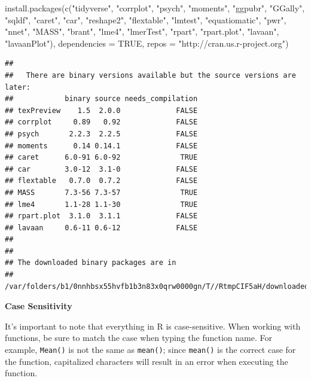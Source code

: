 \documentclass[
]{book}
\newenvironment{Shaded}{\begin{snugshade}}{\end{snugshade}}
\newcommand{\AttributeTok}[1]{\textcolor[rgb]{0.77,0.63,0.00}{#1}}
\newcommand{\ConstantTok}[1]{\textcolor[rgb]{0.00,0.00,0.00}{#1}}
\newcommand{\FunctionTok}[1]{\textcolor[rgb]{0.00,0.00,0.00}{#1}}
\newcommand{\NormalTok}[1]{#1}
\newcommand{\StringTok}[1]{\textcolor[rgb]{0.31,0.60,0.02}{#1}}
\begin{document}
\begin{Shaded}
\begin{Highlighting}[]
\FunctionTok{install.packages}\NormalTok{(}\FunctionTok{c}\NormalTok{(}\StringTok{"tidyverse"}\NormalTok{, }\StringTok{"corrplot"}\NormalTok{, }\StringTok{"psych"}\NormalTok{, }\StringTok{"moments"}\NormalTok{, }\StringTok{"ggpubr"}\NormalTok{, }\StringTok{"GGally"}\NormalTok{, }\StringTok{"sqldf"}\NormalTok{, }\StringTok{"caret"}\NormalTok{, }\StringTok{"car"}\NormalTok{, }\StringTok{"reshape2"}\NormalTok{, }\StringTok{"flextable"}\NormalTok{, }\StringTok{"lmtest"}\NormalTok{, }\StringTok{"equatiomatic"}\NormalTok{, }\StringTok{"pwr"}\NormalTok{, }\StringTok{"nnet"}\NormalTok{, }\StringTok{"MASS"}\NormalTok{, }\StringTok{"brant"}\NormalTok{, }\StringTok{"lme4"}\NormalTok{, }\StringTok{"lmerTest"}\NormalTok{, }\StringTok{"rpart"}\NormalTok{, }\StringTok{"rpart.plot"}\NormalTok{, }\StringTok{"lavaan"}\NormalTok{, }\StringTok{"lavaanPlot"}\NormalTok{), }\AttributeTok{dependencies =} \ConstantTok{TRUE}\NormalTok{, }\AttributeTok{repos =} \StringTok{"http://cran.us.r{-}project.org"}\NormalTok{)}
\end{Highlighting}
\end{Shaded}

\begin{verbatim}
## 
##   There are binary versions available but the source versions are later:
##            binary source needs_compilation
## texPreview    1.5  2.0.0             FALSE
## corrplot     0.89   0.92             FALSE
## psych       2.2.3  2.2.5             FALSE
## moments      0.14 0.14.1             FALSE
## caret      6.0-91 6.0-92              TRUE
## car        3.0-12  3.1-0             FALSE
## flextable   0.7.0  0.7.2             FALSE
## MASS       7.3-56 7.3-57              TRUE
## lme4       1.1-28 1.1-30              TRUE
## rpart.plot  3.1.0  3.1.1             FALSE
## lavaan     0.6-11 0.6-12             FALSE
## 
## 
## The downloaded binary packages are in
##  /var/folders/b1/0nnhbsx55hvfb1b3n83x0qrw0000gn/T//RtmpCIF5aH/downloaded_packages
\end{verbatim}

\textbf{Case Sensitivity}

It's important to note that everything in R is case-sensitive. When working with functions, be sure to match the case when typing the function name. For example, \texttt{Mean()} is not the same as \texttt{mean()}; since \texttt{mean()} is the correct case for the function, capitalized characters will result in an error when executing the function.
\end{document}
